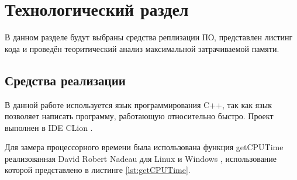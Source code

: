 \chapter{Технологический раздел}
\label{cha:technological}

    В данном разделе будут выбраны средства реплизации ПО, представлен листинг кода
    и проведён теоритический анализ максимальной затрачиваемой памяти. 

    \section{Средства реализации}
        В данной работе используется язык программирования C++, так как
        язык позволяет написать программу, работающую относительно быстро. 
        Проект выполнен в IDE CLion \cite{clion}.

        Для замера процессорного времени была использована функция getCPUTime \cite{getCPUTime}
реализованная David Robert Nadeau для Linux и Windows , использование которой представлено в листинге \ref{lst:getCPUTime}.

